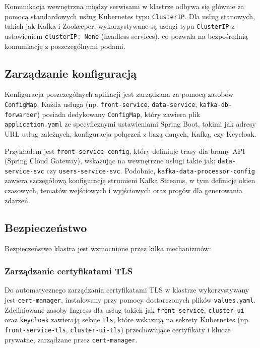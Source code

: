 Komunikacja wewnętrzna między serwisami w klastrze odbywa się głównie za pomocą standardowych usług Kubernetes typu \texttt{ClusterIP}. Dla usług stanowych, takich jak Kafka i Zookeeper, wykorzystywane są usługi typu \texttt{ClusterIP} z ustawieniem \texttt{clusterIP: None} (headless services), co pozwala na bezpośrednią komunikację z poszczególnymi podami.

\subsection{Zarządzanie konfiguracją}

Konfiguracja poszczególnych aplikacji jest zarządzana za pomocą zasobów \texttt{ConfigMap}. Każda usługa (np. \texttt{front-service}, \texttt{data-service}, \texttt{kafka-db-forwarder}) posiada dedykowany \texttt{ConfigMap}, który zawiera plik \texttt{application.yaml} ze specyficznymi ustawieniami Spring Boot, takimi jak adresy URL usług zależnych, konfiguracja połączeń z bazą danych, Kafką, czy Keycloak.

Przykładem jest \texttt{front-service-config}, który definiuje trasy dla bramy API (Spring Cloud Gateway), wskazując na wewnętrzne usługi takie jak: \texttt{data-service-svc} czy \texttt{users-service-svc}. Podobnie, \texttt{kafka-data-processor-config} zawiera szczegółową konfigurację strumieni Kafka Streams, w tym definicje okien czasowych, tematów wejściowych i wyjściowych oraz progów dla generowania zdarzeń.

\subsection{Bezpieczeństwo}

Bezpieczeństwo klastra jest wzmocnione przez kilka mechanizmów:

\subsubsection{Zarządzanie certyfikatami TLS}
Do automatycznego zarządzania certyfikatami TLS w klastrze wykorzystywany jest \texttt{cert-manager}, instalowany przy pomocy dostarczonych plików \texttt{values.yaml}. Zdefiniowane zasoby Ingress dla usług takich jak \texttt{front-service}, \texttt{cluster-ui} oraz \texttt{keycloak} zawierają sekcje \texttt{tls}, które wskazują na sekrety Kubernetes (np. \texttt{front-service-tls}, \texttt{cluster-ui-tls}) przechowujące certyfikaty i klucze prywatne, zarządzane przez \texttt{cert-manager}.


